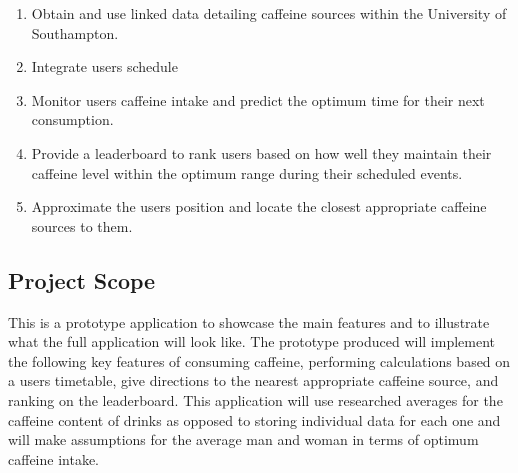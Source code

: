 \begin{enumerate}
	\item{Obtain and use linked data detailing caffeine sources within the University of Southampton.}
	\item{Integrate users schedule}
	\item{Monitor users caffeine intake and predict the optimum time for their next consumption.}
	\item{Provide a leaderboard to rank users based on how well they maintain their caffeine level within the optimum range during their scheduled events.}
	\item{Approximate the users position and locate the closest appropriate caffeine sources to them.}
\end{enumerate}

\subsection{Project Scope}
This is a prototype application to showcase the main features and to illustrate what the full application will look like. 
The prototype produced will implement the following key features of consuming caffeine, performing calculations based on a users timetable, give directions to the nearest appropriate caffeine source, and ranking on the leaderboard. 
This application will use researched averages for the caffeine content of drinks as opposed to storing individual data for each one and will make assumptions for the average man and woman in terms of optimum caffeine intake.  
